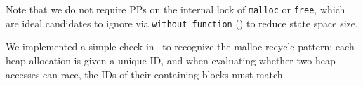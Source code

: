 Note that we do not require PPs on the internal lock of {\tt malloc} or {\tt free},
which are ideal candidates to ignore via {\tt without\_function} (\sect{\ref{sec:landslide}}) to reduce state space size.

We implemented a simple check in \landslide~to recognize the malloc-recycle pattern:
each heap allocation is given a unique ID,
and when evaluating whether two heap accesses can race,
the IDs of their containing blocks must match.
